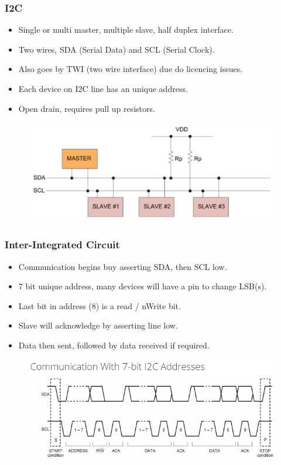 \documentclass[t]{beamer}
\begin{document}

\begin{frame}[t]
\frametitle{I2C}
\begin{itemize}
	\item Single or multi master, multiple slave, half duplex interface.
	\item Two wires, SDA (Serial Data) and SCL (Serial Clock).
	\item Also goes by TWI (two wire interface) due do licencing issues.
	\item Each device on I2C line has an unique address. 
	\item Open drain, requires pull up resistors.
\end{itemize}
\begin{figure}
	\includegraphics[width=\linewidth]{i2cBus.png}
\end{figure}

\end{frame}



\begin{frame}[t]
\frametitle{Inter-Integrated Circuit}
\begin{itemize}
	\item Communication begins buy asserting SDA, then SCL low.
	\item 7 bit unique address, many devices will have a pin to change LSB(s). 
	\item Last bit in address (8) is a read / nWrite bit. 
	\item Slave will acknowledge by asserting line low. 
	\item Data then sent, followed by data received if required. 
\end{itemize}
\begin{figure}
	\includegraphics[width=0.7\linewidth]{i2c.png}
\end{figure}

\end{frame}
\end{document}
